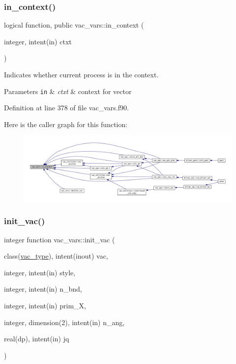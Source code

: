 \subsubsection{\texorpdfstring{in\+\_\+context()}{in\_context()}}
{\footnotesize\ttfamily logical function, public vac\+\_\+vars\+::in\+\_\+context (\begin{DoxyParamCaption}\item[{integer, intent(in)}]{ctxt }\end{DoxyParamCaption})}



Indicates whether current process is in the context. 


\begin{DoxyParams}[1]{Parameters}
\mbox{\tt in}  & {\em ctxt} & context for vector \\
\hline
\end{DoxyParams}


Definition at line 378 of file vac\+\_\+vars.\+f90.

Here is the caller graph for this function\+:\nopagebreak
\begin{figure}[H]
\begin{center}
\leavevmode
\includegraphics[width=350pt]{namespacevac__vars_af0fd2f819434bf7adc494753df4af19c_icgraph}
\end{center}
\end{figure}
\mbox{\label{namespacevac__vars_a81df0b01b0c2bf8072453f4ca12e2d5e}} 
\subsubsection{\texorpdfstring{init\+\_\+vac()}{init\_vac()}}
{\footnotesize\ttfamily integer function vac\+\_\+vars\+::init\+\_\+vac (\begin{DoxyParamCaption}\item[{class(\hyperlink{structvac__vars_1_1vac__type}{vac\+\_\+type}), intent(inout)}]{vac,  }\item[{integer, intent(in)}]{style,  }\item[{integer, intent(in)}]{n\+\_\+bnd,  }\item[{integer, intent(in)}]{prim\+\_\+X,  }\item[{integer, dimension(2), intent(in)}]{n\+\_\+ang,  }\item[{real(dp), intent(in)}]{jq }\end{DoxyParamCaption})}



